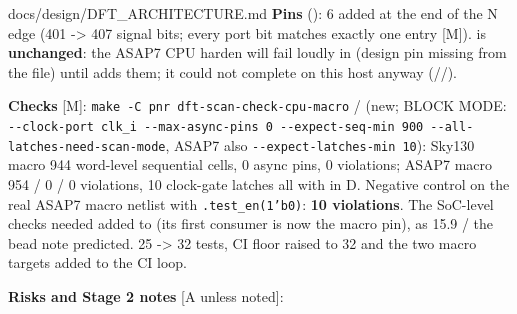 \begin{relocated}{docs/design/DFT_ARCHITECTURE.md}
\textbf{Pins} (): 6 added at the end
of the N edge (401 -\textgreater{} 407 signal bits; every port bit
matches exactly one entry {[}M{]}).  is
\textbf{unchanged}: the ASAP7 CPU harden will fail loudly in
 (design pin missing from the file) until
 adds them; it could not complete on this host anyway
(//).

\textbf{Checks} {[}M{]}:
\texttt{make\ -\allowbreak{}C\ pnr\ dft-\allowbreak{}scan-\allowbreak{}check-\allowbreak{}cpu-\allowbreak{}macro}
/  (new;
 BLOCK MODE:
\texttt{-\allowbreak{}-\allowbreak{}clock-\allowbreak{}port\ clk\_\allowbreak{}i\ -\allowbreak{}-\allowbreak{}max-\allowbreak{}async-\allowbreak{}pins\ 0\ -\allowbreak{}-\allowbreak{}expect-\allowbreak{}seq-\allowbreak{}min\ 900\ -\allowbreak{}-\allowbreak{}all-\allowbreak{}latches-\allowbreak{}need-\allowbreak{}scan-\allowbreak{}mode},
ASAP7 also
\texttt{-\allowbreak{}-\allowbreak{}expect-\allowbreak{}latches-\allowbreak{}min\ 10}):
Sky130 macro 944 word-level sequential cells, 0 async pins, 0
violations; ASAP7 macro 954 / 0 / 0 violations, 10 clock-gate latches
all with  in D. Negative control on the real ASAP7
macro netlist with \texttt{.\allowbreak{}test\_\allowbreak{}en(1'b0)}:
\textbf{10 violations}. The SoC-level checks needed
 added to  (its
first consumer is now the macro pin), as 15.9 / the bead note predicted.
 25 -\textgreater{} 32 tests, CI
floor raised to 32 and the two macro targets added to the CI loop.

\textbf{Risks and Stage 2 notes} {[}A unless noted{]}:


\end{relocated}
